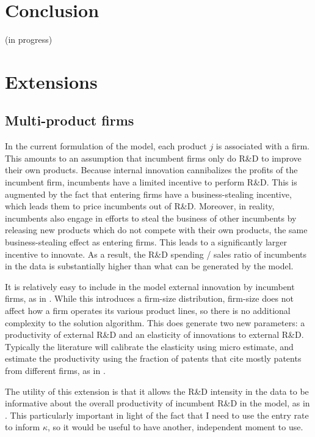 \documentclass[12pt,english]{article}
\theoremstyle{remark}
\begin{document}
\section{Conclusion}\label{conclusion}

(in progress)



\break
\appendix

\section{Extensions}\label{extensions}


\subsection{Multi-product firms}

In the current formulation of the model, each product $j$ is associated with a firm. This amounts to an assumption that incumbent firms only do R\&D to improve their own products. Because internal innovation cannibalizes the profits of the incumbent firm, incumbents have a limited incentive to perform R\&D. This is augmented by the fact that entering firms have a business-stealing incentive, which leads them to price incumbents out of R\&D. Moreover, in reality, incumbents also engage in efforts to steal the business of other incumbents by releasing new products which do not compete with their own products, the same business-stealing effect as entering firms. This leads to a significantly larger incentive to innovate. As a result, the R\&D spending / sales ratio of incumbents in the data is substantially higher than what can be generated by the model.

It is relatively easy to include in the model external innovation by incumbent firms, as in \cite{klette_innovating_2004}. While this introduces a firm-size distribution, firm-size does not affect how a firm operates its various product lines, so there is no additional complexity to the solution algorithm. This does generate two new parameters: a productivity of external R\&D and an elasticity of innovations to external R\&D. Typically the literature will calibrate the elasticity using micro estimate, and estimate the productivity using the fraction of patents that cite mostly patents from different firms, as in \cite{akcigit_growth_2018}.

The utility of this extension is that it allows the R\&D intensity in the data to be informative about the overall productivity of incumbent R\&D in the model, as in \cite{akcigit_growth_2018}. This particularly important in light of the fact that I need to use the entry rate to inform $\kappa$, so it would be useful to have another, independent moment to use. 
\end{document}
